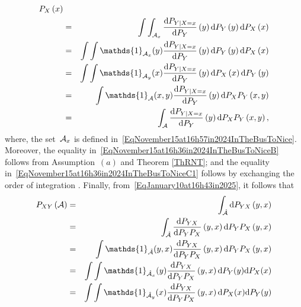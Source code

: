\documentclass[lettersize,onecolumn]{IEEEtran}
\begin{document}
\begin{IEEEproof}
\begin{eqnarray}
P_{X} \left( x\right)\\
\label{EqNovember15at16h36in2024InTheBusToNiceB}
& = & \int \int_{ \set{A}_{x} } \frac{\mathrm{d} P_{Y | X = x} }{\mathrm{d}P_{Y}} \left( y \right)\mathrm{d} P_{Y} \left( y\right) \mathrm{d}P_{X}\left( x \right)   \\
\label{EqNovember15at16h36in2024InTheBusToNiceC}
& = & \int \int \mathds{1}_{\set{A}_x}(y) \frac{\mathrm{d} P_{Y | X = x} }{\mathrm{d}P_{Y}} \left( y \right) \mathrm{d} P_{Y} \left( y\right) 
\mathrm{d}P_{X}\left( x \right)   \\
\label{EqNovember15at16h36in2024InTheBusToNiceC1}
& = & \int \int \mathds{1}_{\set{A}_y}(x) \frac{\mathrm{d} P_{Y | X = x} }{\mathrm{d}P_{Y}} \left( y \right)  \mathrm{d}P_{X}\left( x \right) 
\mathrm{d} P_{Y} \left( y\right)    \\
\label{EqNovember15at16h36in2024InTheBusToNiceD}
& = & \int \mathds{1}_{\set{A}}(x,y) \frac{\mathrm{d} P_{Y | X = x} }{\mathrm{d}P_{Y}} \left( y \right) \mathrm{d} P_{X}P_{Y}  \left(  x , 
y\right)   \\\label{EqNovember15at16h36in2024InTheBusToNiceE}
& = & \int_{\set{A}} \frac{\mathrm{d} P_{Y | X = x} }{\mathrm{d}P_{Y}} \left( y \right)  \mathrm{d} P_{X}P_{Y}  \left(  x , y\right),  
\end{eqnarray}
where, the set~$\mathcal A_{x}$ is defined in~\eqref{EqNovember15at16h57in2024InTheBusToNice}.  Moreover, the equality 
in~\eqref{EqNovember15at16h36in2024InTheBusToNiceB} follows from Assumption~$\left(a\right)$ and Theorem \ref{ThRNT}; and
the equality in~\eqref{EqNovember15at16h36in2024InTheBusToNiceC1} follows by exchanging the order of integration \cite[Theorem~2.6.6]{ash2000probability}.
Finally, from~\eqref{EqJanuary10at16h43in2025}, it follows that
\begin{eqnarray}
\nonumber
P_{XY}\left( \set{A} \right) 
&=& \int_ {\hat{\set{A}} } \mathrm{d} P_{YX}\left(y,x\right)\\
\label{EqAntibesTT1}
&=& \int_{\hat{\set{A}}}\frac{ \mathrm{d}P_{YX}} { \mathrm{d} P_YP_X}\left(y,x\right) \mathrm{d}P_YP_X\left(y,x\right)\\ 
&=& \int \mathds{1}_{\hat{\set{A}}}(y,x) \frac{ \mathrm{d}P_{YX}} { \mathrm{d} P_YP_X}\left(y,x\right) \mathrm{d}P_YP_X\left(y,x\right)  \\
\label{EqAntibesTT2}
&=&  \int \int \mathds{1}_{\hat{\set{A}}_x}(y)\frac{ \mathrm{d}P_{YX}} { \mathrm{d} P_YP_X}\left(y,x\right) \mathrm{d}P_Y(y) \mathrm{d}P_X(x) \\
\label{EqAntibesTT3}
&=& \int \int \mathds{1}_{\hat{\set{A}}_y}(x)\frac{ \mathrm{d}P_{YX}} { \mathrm{d} P_YP_X}\left(y,x\right) \mathrm{d}P_X(x) \mathrm{d}P_Y(y)  \\

\end{eqnarray}
\end{IEEEproof}
\end{document}
